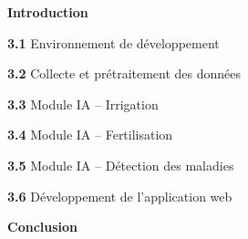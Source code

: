 \documentclass[12pt,a4paper]{report}
\begin{document}
	\vspace{3pt}
	\begin{list}{}{%
			\setlength{\leftmargin}{0pt}
			\setlength{\itemsep}{2pt}
		}
		\item \textbf{Introduction} \dotfill 
		
		\vspace{4pt}
		\item \textbf{3.1} \quad Environnement de d\'eveloppement \dotfill 
		
		
		\vspace{4pt}
		\item \textbf{3.2} \quad Collecte et pr\'etraitement des donn\'ees \dotfill 
		
		
		\vspace{4pt}
		\item \textbf{3.3} \quad Module IA -- Irrigation \dotfill 
	
		
		\vspace{4pt}
		\item \textbf{3.4} \quad Module IA -- Fertilisation \dotfill 
		
		
		\vspace{4pt}
		\item \textbf{3.5} \quad Module IA -- D\'etection des maladies \dotfill 
		
		
		\vspace{4pt}
		\item \textbf{3.6} \quad D\'eveloppement de l'application web \dotfill 
		
		
		\vspace{4pt}
		\item \textbf{Conclusion} \dotfill 
	\end{list}
	
	\vspace{0.8cm}
	
	
	\noindent
	\colorbox{bleuPrincipal}{%
		\parbox{\linewidth}{%
			\vspace{3pt}
			\hfill{\color{white}\bfseries }
			\vspace{3pt}
		}%
	}
	
\end{document}
